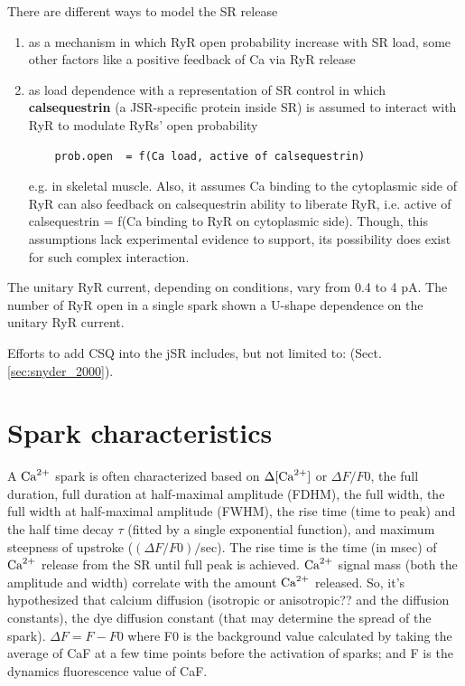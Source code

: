 There are different ways to model the SR release 
\begin{enumerate}
\item as a mechanism in which RyR open probability increase with SR load,
  some other factors like a positive feedback of Ca via RyR release
\item as load dependence with a representation of SR control in which
  {\bf calsequestrin} (a JSR-specific protein inside SR) is assumed to
  interact with RyR to modulate RyRs' open
  probability~\citep{ikemoto1989prc, snyder2000mmc}
\begin{verbatim} 
    prob.open  = f(Ca load, active of calsequestrin)
\end{verbatim}
  e.g. in skeletal muscle\citep{gilchrist1992icd}. Also, it assumes Ca
  binding to the cytoplasmic side of RyR can also feedback on
  calsequestrin ability to liberate RyR, i.e. active of calsequestrin
  = f(Ca binding to RyR on cytoplasmic side). Though, this assumptions
  lack experimental evidence to support, its possibility does exist
  for such complex interaction.
\end{enumerate}

The unitary RyR current, depending on conditions, vary from 0.4 to 4
pA. The number of RyR open in a single spark shown a U-shape
dependence on the unitary RyR current. 

Efforts to add CSQ into the jSR includes, but not limited to:
\citep{snyder2000mmc} (Sect.\ref{sec:snyder_2000}).

\section{Spark characteristics}
\label{sec:spark-characteristics}

A ${\text{Ca}^{2+}}$ spark is often characterized based on $\Delta [{\text{Ca}^{2+}}]$ or $\Delta F/F0$,
the full duration, full duration at half-maximal amplitude (FDHM), the full
width, the full width at half-maximal amplitude (FWHM), the rise time (time to
peak) and the half time decay $\tau$ (fitted by a single exponential function),
and maximum steepness of upstroke ($(\Delta F/F0)/$sec). The rise time is the
time (in msec) of ${\text{Ca}^{2+}}$ release from the SR until full peak is achieved. ${\text{Ca}^{2+}}$
signal mass (both the amplitude and width) correlate with the amount ${\text{Ca}^{2+}}$ released.
So, it's hypothesized that calcium diffusion (isotropic or anisotropic?? and the
diffusion constants), the dye diffusion constant (that may determine the spread
of the spark). $\Delta F=F-F0$ where F0 is the background value calculated by
taking the average of CaF at a few time points before the activation of sparks;
and F is the dynamics fluorescence value of CaF.

